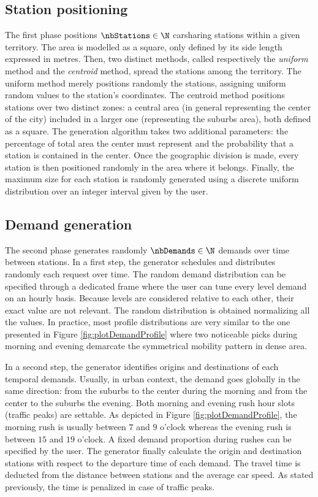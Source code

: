 \begin{bibunit}[ieeetr]
\subsection{Station positioning}
The first phase positions $\nbStations \in \N$ carsharing stations within a given territory.
The area is modelled as a square, only defined by its side length expressed in metres.
Then, two distinct methods, called respectively the \emph{uniform} method and the \emph{centroid} method, spread the stations among the territory.
The uniform method merely positions randomly the stations, assigning uniform random values to the station's coordinates.
The centroid method positions stations over two distinct zones: a central area (in general representing the center of the city) included in a larger one (representing the suburbs area), both defined as a square.
The generation algorithm takes two additional parameters: the percentage of total area the center must represent and the probability that a station is contained in the center.
Once the geographic division is made, every station is then positioned randomly in the area where it belongs. 
Finally, the maximum size for each station is randomly generated using a discrete uniform distribution over an integer interval given by the user. %


\subsection{Demand generation}
The second phase generates randomly $\nbDemands \in \N$ demands over time between stations.
In a first step, the generator schedules and distributes randomly each request over time.
The random demand distribution can be specified through a dedicated frame where the user can tune every level demand on an hourly basis.
Because levels are considered relative to each other, their exact value are not relevant.
The random distribution is obtained normalizing all the values. %
In practice, most profile distributions are very similar to the one presented in Figure \ref{fig:plotDemandProfile} where two noticeable picks during morning and evening demarcate the symmetrical mobility pattern in dense area.

\medskip
In a second step, the generator identifies origins and destinations of each temporal demands.
Usually, in urban context, the demand goes globally in the same direction: from the suburbs to the center during the morning and from the center to the suburbs the evening.
Both morning and evening rush hour slots (traffic peaks) are settable.
As depicted in Figure \ref{fig:plotDemandProfile}, the morning rush is usually between $7$ and $9$ o'clock whereas the evening rush is between $15$ and $19$ o'clock.
A fixed demand proportion during rushes can be specified by the user.
The generator finally calculate the origin and destination stations with respect to the departure time of each demand.
The travel time is deducted from the distance between stations and the average car speed.
As stated previously, the time is penalized in case of traffic peaks.



\end{bibunit}
